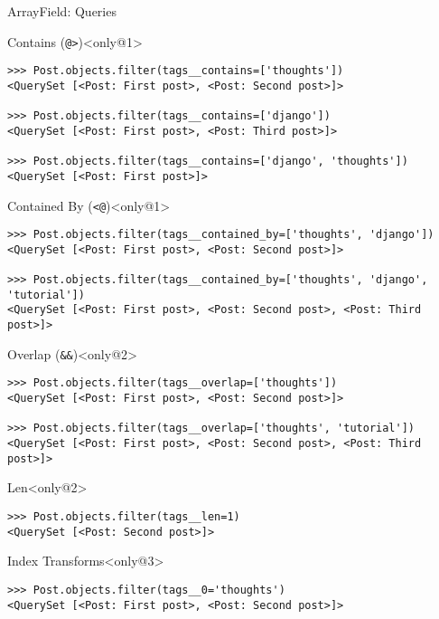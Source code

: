 \begin{frame}[fragile]{ArrayField: Queries}
    \begin{block}{Contains (\texttt{@}\texttt{>})}<only@1>
        \begin{verbatim}
>>> Post.objects.filter(tags__contains=['thoughts'])
<QuerySet [<Post: First post>, <Post: Second post>]>

>>> Post.objects.filter(tags__contains=['django'])
<QuerySet [<Post: First post>, <Post: Third post>]>

>>> Post.objects.filter(tags__contains=['django', 'thoughts'])
<QuerySet [<Post: First post>]>
        \end{verbatim}
    \end{block}
    \begin{block}{Contained By (\texttt{<}\texttt{@})}<only@1>
        \begin{verbatim}
>>> Post.objects.filter(tags__contained_by=['thoughts', 'django'])
<QuerySet [<Post: First post>, <Post: Second post>]>

>>> Post.objects.filter(tags__contained_by=['thoughts', 'django', 'tutorial'])
<QuerySet [<Post: First post>, <Post: Second post>, <Post: Third post>]>
        \end{verbatim}
    \end{block}
    \begin{block}{Overlap (\texttt{\&}\texttt{\&})}<only@2>
        \begin{verbatim}
>>> Post.objects.filter(tags__overlap=['thoughts'])
<QuerySet [<Post: First post>, <Post: Second post>]>

>>> Post.objects.filter(tags__overlap=['thoughts', 'tutorial'])
<QuerySet [<Post: First post>, <Post: Second post>, <Post: Third post>]>
        \end{verbatim}
    \end{block}
    \begin{block}{Len}<only@2>
        \begin{verbatim}
>>> Post.objects.filter(tags__len=1)
<QuerySet [<Post: Second post>]>
        \end{verbatim}
    \end{block}
    \begin{block}{Index Transforms}<only@3>
        \begin{verbatim}
>>> Post.objects.filter(tags__0='thoughts')
<QuerySet [<Post: First post>, <Post: Second post>]>


\end{verbatim}
\end{block}
\end{frame}

